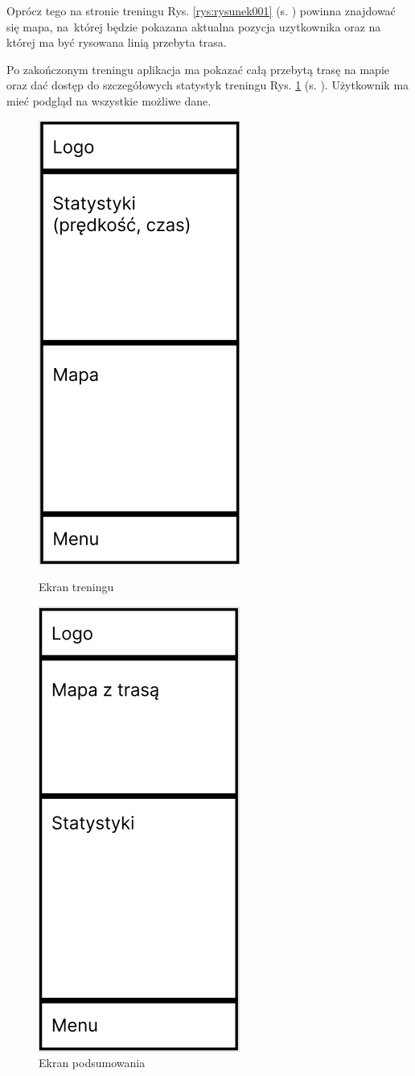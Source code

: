 Oprócz tego na stronie treningu Rys. \ref{rys:rysunek001} (s. \pageref{rys:rysunek001}) powinna znajdować się mapa, na~której będzie pokazana aktualna pozycja uzytkownika oraz na której ma być rysowana linią przebyta trasa.

Po zakończonym treningu aplikacja ma pokazać całą przebytą trasę na mapie oraz dać dostęp do szczegółowych statystyk treningu Rys. \ref{rys:rysunek002} (s. \pageref{rys:rysunek002}). Użytkownik ma mieć podgląd na wszystkie możliwe dane.

\begin{figure}[!htb]
	\centering
	\begin{minipage}{.5\textwidth}
		\centering
		\includegraphics[width=.4\linewidth]{rys/ekran_treningu.png}
		\caption{Ekran treningu}
		\label{rys:rysunek001}
	\end{minipage}%
	\begin{minipage}{.5\textwidth}
		\centering
		\includegraphics[width=.4\linewidth]{rys/ekran_podsumowania.png}
		\caption{Ekran podsumowania}
		\label{rys:rysunek002}
	\end{minipage}
\end{figure}

